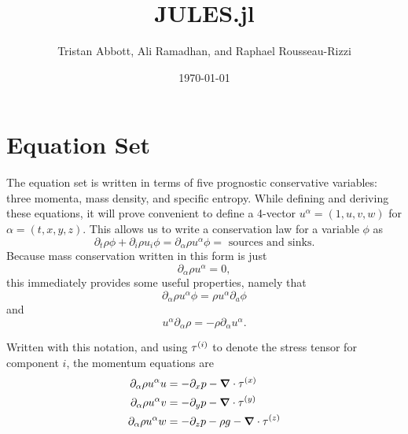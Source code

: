 \documentclass[11pt]{article}
\title{JULES.jl}
\author{Tristan Abbott, Ali Ramadhan, and Raphael Rousseau-Rizzi}
\date{\today}
\begin{document}
\maketitle

\section{Equation Set}

The equation set is written in terms of five prognostic conservative variables: three momenta, mass density, and specific entropy. While defining and deriving these equations, it will prove convenient to define a 4-vector $u^\alpha = (1, u, v, w)$ for $\alpha = (t, x, y, z)$. This allows us to write a conservation law for a variable $\phi$ as
\begin{equation*}
\partial_t \rho \phi + \partial_i \rho u_i \phi = \partial_{\alpha} \rho u^{\alpha} \phi = \textrm{ sources and sinks}.
\end{equation*}
Because mass conservation written in this form is just
\begin{equation}
\partial_\alpha \rho u^{\alpha} = 0,
\end{equation}
this immediately provides some useful properties, namely that
\begin{equation*}
\partial_\alpha \rho u^{\alpha} \phi = \rho u^{\alpha} \partial_a \phi
\end{equation*}
and
\begin{equation*}
u^{\alpha} \partial_{\alpha} \rho = -\rho \partial_{\alpha} u^{\alpha}.
\end{equation*}

Written with this notation, and using ${\bf \tau}^{(i)}$ to denote the stress tensor for component $i$, the momentum equations are
\begin{align}
\partial_{\alpha} \rho u^{\alpha} u &= -\partial_x p - \grad \cdot {\bf \tau}^{(x)} \\
\partial_{\alpha} \rho u^{\alpha} v &= -\partial_y p - \grad \cdot {\bf \tau}^{(y)} \\
\partial_{\alpha} \rho u^{\alpha} w &= -\partial_z p - \rho g - \grad \cdot {\bf \tau}^{(z)} \\
\end{align}
\end{document}
